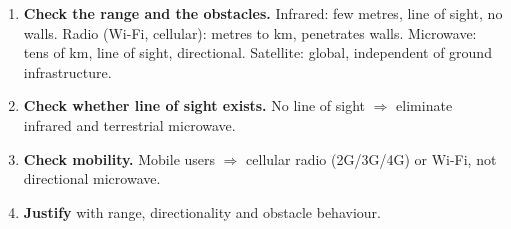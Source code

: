 \documentclass[11pt]{article}
\begin{document}
\begin{methode}
\begin{enumerate}
\item \textbf{Check the range and the obstacles.} Infrared: few metres, line of sight, no walls. Radio (Wi-Fi, cellular): metres to km, penetrates walls. Microwave: tens of km, line of sight, directional. Satellite: global, independent of ground infrastructure.
\item \textbf{Check whether line of sight exists.} No line of sight $\Rightarrow$ eliminate infrared and terrestrial microwave.
\item \textbf{Check mobility.} Mobile users $\Rightarrow$ cellular radio (2G/3G/4G) or Wi-Fi, not directional microwave.
\item \textbf{Justify} with range, directionality and obstacle behaviour.
\end{enumerate}
\end{methode}
\end{document}
